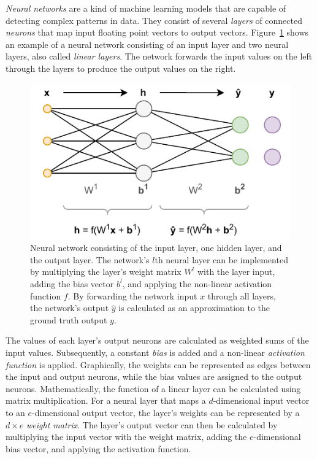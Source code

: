 \emph{Neural networks} are a kind of machine learning models that are capable of detecting complex patterns in data. They consist of several \emph{layers} of connected \emph{neurons} that map input floating point vectors to output vectors. Figure~\ref{fig:2_basics/3_neural_networks/nn} shows an example of a neural network consisting of an input layer and two neural layers, also called \emph{linear layers}. The network forwards the input values on the left through the layers to produce the output values on the right.

\begin{figure}[t]
    \centering
    \includegraphics{2_basics/3_neural_networks/nn}
    \caption{Neural network consisting of the input layer, one hidden layer, and the output layer. The network's $l$th neural layer can be implemented by multiplying the layer's weight matrix $W^l$ with the layer input, adding the bias vector $b^l$, and applying the non-linear activation function $f$. By forwarding the network input $x$ through all layers, the network's output $\hat{y}$ is calculated as an approximation to the ground truth output $y$.}
    \label{fig:2_basics/3_neural_networks/nn}
\end{figure}

The values of each layer's output neurons are calculated as weighted sums of the input values. Subsequently, a constant \emph{bias} is added and a non-linear \emph{activation function} is applied. Graphically, the weights can be represented as edges between the input and output neurons, while the bias values are assigned to the output neurons. Mathematically, the function of a linear layer can be calculated using matrix multiplication. For a neural layer that maps a $d$-dimensional input vector to an $e$-dimensional output vector, the layer's weights can be represented by a $d \times e$ \emph{weight matrix}. The layer's output vector can then be calculated by multiplying the input vector with the weight matrix, adding the $e$-dimensional bias vector, and applying the activation function.

